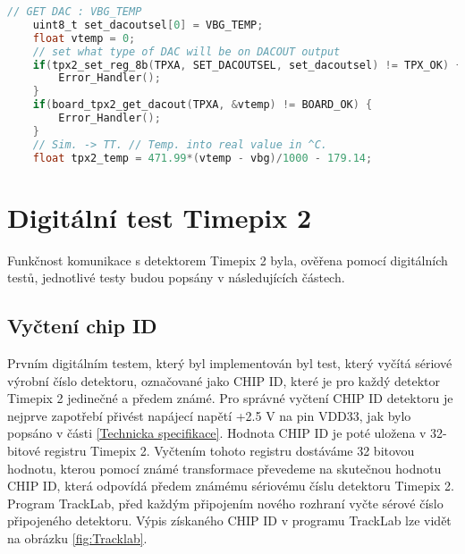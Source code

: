 \begin{lstlisting}[frame=single, language=C, caption={Výběr výstupu DACOUT detektoru Timepix2 a odečtení hodnoty detektoru.}, label=kod_temp_tpx2]
	// GET DAC : VBG_TEMP
	uint8_t set_dacoutsel[0] = VBG_TEMP; 
	float vtemp = 0;
	// set what type of DAC will be on DACOUT output								   
	if(tpx2_set_reg_8b(TPXA, SET_DACOUTSEL, set_dacoutsel) != TPX_OK) {    
		Error_Handler();
	}
	if(board_tpx2_get_dacout(TPXA, &vtemp) != BOARD_OK) {
		Error_Handler();
	}
	// Sim. -> TT. // Temp. into real value in ^C.
	float tpx2_temp = 471.99*(vtemp - vbg)/1000 - 179.14;					
\end{lstlisting}

\section{Digitální test Timepix 2} %
Funkčnost komunikace s detektorem Timepix 2 byla, ověřena pomocí digitálních testů, jednotlivé testy budou popsány v následujících částech.
	\subsection{Vyčtení chip ID}
	Prvním digitálním testem, který byl implementován byl test, který vyčítá sériové výrobní číslo detektoru, označované jako CHIP ID, které je pro každý detektor Timepix 2 jedinečné a předem známé. Pro správné vyčtení CHIP ID detektoru je nejprve zapotřebí přivést napájecí napětí +2.5 V na pin VDD33, jak bylo popsáno v části \ref{Technicka specifikace}. Hodnota CHIP ID je poté uložena v 32-bitové registru Timepix 2. Vyčtením tohoto registru dostáváme 32 bitovou hodnotu, kterou pomocí známé transformace převedeme na skutečnou hodnotu CHIP ID, která odpovídá předem známému sériovému číslu detektoru Timepix 2. Program TrackLab, před každým připojením nového rozhraní vyčte sérové číslo připojeného detektoru. Výpis získaného CHIP ID v programu TrackLab lze vidět na obrázku \ref{fig:Tracklab}.

